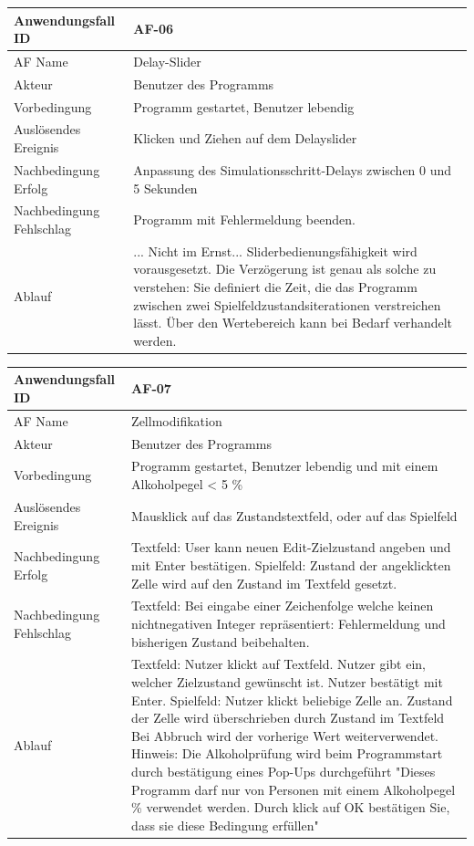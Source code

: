 \documentclass[11pt,a4paper]{article}
\begin{document}
\begin{tabular}[m]{|m{7cm}|m{9cm}|}
    \hline
    Anwendungsfall ID     & AF-06 \\
         \hline
    AF Name     &  Delay-Slider\\
         \hline
    Akteur&Benutzer des Programms \\
    \hline
    Vorbedingung&Programm gestartet, Benutzer lebendig\\
    \hline
    Auslösendes Ereignis&Klicken und Ziehen auf dem Delayslider\\
    \hline
    Nachbedingung Erfolg&Anpassung des Simulationsschritt-Delays zwischen 0 und 5 Sekunden\\
    \hline
    Nachbedingung Fehlschlag&Programm mit Fehlermeldung beenden.\\
    \hline
    Ablauf&... Nicht im Ernst... Sliderbedienungsfähigkeit wird vorausgesetzt. \newline Die Verzögerung ist genau als solche zu verstehen: Sie definiert die Zeit, die das Programm zwischen zwei Spielfeldzustandsiterationen verstreichen lässt. Über den Wertebereich kann bei Bedarf verhandelt werden.
    \\
    \hline
\end{tabular}
\par


\begin{tabular}[m]{|m{7cm}|m{9cm}|}
    \hline
    Anwendungsfall ID     & AF-07 \\
         \hline
    AF Name     & Zellmodifikation \\
         \hline
    Akteur&Benutzer des Programms \\
    \hline
    Vorbedingung&Programm gestartet, Benutzer lebendig und mit einem Alkoholpegel < 5 \% \\
    \hline
    Auslösendes Ereignis&Mausklick auf das Zustandstextfeld, oder auf das Spielfeld\\
    \hline
    Nachbedingung Erfolg& Textfeld: User kann neuen Edit-Zielzustand angeben und mit Enter bestätigen. Spielfeld: Zustand der angeklickten Zelle wird auf den Zustand im Textfeld gesetzt. \\
    \hline
    Nachbedingung Fehlschlag&Textfeld: Bei eingabe einer Zeichenfolge welche keinen nichtnegativen Integer repräsentiert: Fehlermeldung und bisherigen Zustand beibehalten.\\
    \hline
    Ablauf&Textfeld: Nutzer klickt auf Textfeld. Nutzer gibt ein, welcher Zielzustand gewünscht ist. Nutzer bestätigt mit Enter. 
    Spielfeld: Nutzer klickt beliebige Zelle an. Zustand der Zelle wird überschrieben durch Zustand im Textfeld
    Bei Abbruch wird der vorherige Wert weiterverwendet.
    \newline Hinweis: Die Alkoholprüfung wird beim Programmstart durch bestätigung eines Pop-Ups durchgeführt "Dieses Programm darf nur von Personen mit einem Alkoholpegel \< 5\% verwendet werden. Durch klick auf OK bestätigen Sie, dass sie diese Bedingung erfüllen"\\
    \hline
\end{tabular}
\par
\end{document}
